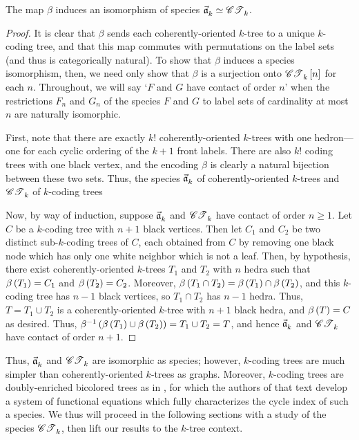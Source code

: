 \documentclass[distribution,draft]{brandiss} %
\numberwithin{section}{chapter}
\numberwithin{figure}{chapter}
\begin{document}
\begin{theorem}\label{thm:bctreeenc}
  The map $\beta$ induces an isomorphism of species $\vec{\mathfrak{a}}_{k}^{} \simeq \mathscr{CT}_{k}^{}$.
\end{theorem}

\begin{proof}
  It is clear that $\beta$ sends each coherently-oriented $k$-tree to a unique $k$-coding tree, and that this map commutes with permutations on the label sets (and thus is categorically natural).
  To show that $\beta$ induces a species isomorphism, then, we need only show that $\beta$ is a surjection onto $\mathscr{CT}_{k}^{} \left[ {n} \right]$ for each $n$.
  Throughout, we will say `$F$ and $G$ have contact of order $n$' when the restrictions $F_{n}$ and $G_{n}$ of the species $F$ and $G$ to label sets of cardinality at most $n$ are naturally isomorphic.
  
  First, note that there are exactly $k!$ coherently-oriented $k$-trees with one hedron---one for each cyclic ordering of the $k+1$ front labels.
  There are also $k!$ coding trees with one black vertex, and the encoding $\beta$ is clearly a natural bijection between these two sets.
  Thus, the species $\vec{\mathfrak{a}}_{k}^{}$ of coherently-oriented $k$-trees and $\mathscr{CT}_{k}^{}$ of $k$-coding trees 

  Now, by way of induction, suppose $\vec{\mathfrak{a}}_{k}^{}$ and $\mathscr{CT}_{k}^{}$ have contact of order $n \geq 1$.
  Let $C$ be a $k$-coding tree with $n+1$ black vertices.
  Then let $C_{1}$ and $C_{2}$ be two distinct sub-$k$-coding trees of $C$, each obtained from $C$ by removing one black node which has only one white neighbor which is not a leaf.
  Then, by hypothesis, there exist coherently-oriented $k$-trees $T_{1}$ and $T_{2}$ with $n$ hedra such that $\beta \left( {T_{1}} \right) = C_{1}$ and $\beta \left( {T_{2}} \right) = C_{2}$.
  Moreover, $\beta \left( {T_{1} \cap T_{2}} \right) = \beta \left( {T_{1}} \right) \cap \beta \left( {T_{2}} \right)$, and this $k$-coding tree has $n-1$ black vertices, so $T_{1} \cap T_{2}$ has $n-1$ hedra.
  Thus, $T = T_{1} \cup T_{2}$ is a coherently-oriented $k$-tree with $n+1$ black hedra, and $\beta \left( {T} \right) = C$ as desired.
  Thus, $\beta^{-1} \left( {\beta \left( {T_{1}} \right) \cup \beta \left( {T_{2}} \right)} \right) = T_{1} \cup T_{2} = T$, and hence $\vec{\mathfrak{a}}_{k}^{}$ and $\mathscr{CT}_{k}^{}$ have contact of order $n+1$.
\end{proof}

Thus, $\vec{\mathfrak{a}}_{k}^{}$ and $\mathscr{CT}_{k}^{}$ are isomorphic as species; however, $k$-coding trees are much simpler than coherently-oriented $k$-trees as graphs.
Moreover, $k$-coding trees are doubly-enriched bicolored trees as in \cite[\S 3.2]{bll:species}, for which the authors of that text develop a system of functional equations which fully characterizes the cycle index of such a species.
We thus will proceed in the following sections with a study of the species $\mathscr{CT}_{k}^{}$, then lift our results to the $k$-tree context.
\end{document}
